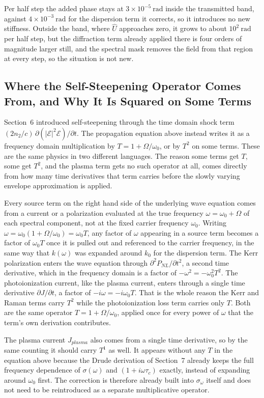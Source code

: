 Per half step the added phase stays at $3\times10^{-5}\ \text{rad}$ inside the transmitted band, against $4\times10^{-3}\ \text{rad}$ for the dispersion term it corrects, so it introduces no new stiffness. Outside the band, where $\hat{U}$ approaches zero, it grows to about $10^2\ \text{rad}$ per half step, but the diffraction term already applied there is four orders of magnitude larger still, and the spectral mask removes the field from that region at every step, so the situation is not new.

\subsection{Where the Self-Steepening Operator Comes From, and Why It Is Squared on Some Terms}

Section~6 introduced self-steepening through the time domain shock term $(2n_2/c)\,\partial(|\mathcal{E}|^2\mathcal{E})/\partial t$. The propagation equation above instead writes it as a frequency domain multiplication by $T=1+\Omega/\omega_0$, or by $T^2$ on some terms. These are the same physics in two different languages. The reason some terms get $T$, some get $T^2$, and the plasma term gets no such operator at all, comes directly from how many time derivatives that term carries before the slowly varying envelope approximation is applied.

Every source term on the right hand side of the underlying wave equation comes from a current or a polarization evaluated at the true frequency $\omega=\omega_0+\Omega$ of each spectral component, not at the fixed carrier frequency $\omega_0$. Writing $\omega=\omega_0(1+\Omega/\omega_0)=\omega_0T$, any factor of $\omega$ appearing in a source term becomes a factor of $\omega_0T$ once it is pulled out and referenced to the carrier frequency, in the same way that $k(\omega)$ was expanded around $k_0$ for the dispersion term. The Kerr polarization enters the wave equation through $\partial^2P_{NL}/\partial t^2$, a second time derivative, which in the frequency domain is a factor of $-\omega^2=-\omega_0^2T^2$. The photoionization current, like the plasma current, enters through a single time derivative $\partial J/\partial t$, a factor of $-i\omega=-i\omega_0T$. That is the whole reason the Kerr and Raman terms carry $T^2$ while the photoionization loss term carries only $T$. Both are the same operator $T=1+\Omega/\omega_0$, applied once for every power of $\omega$ that the term's own derivation contributes.

The plasma current $J_{plasma}$ also comes from a single time derivative, so by the same counting it should carry $T^1$ as well. It appears without any $T$ in the equation above because the Drude derivation of Section~7 already keeps the full frequency dependence of $\sigma(\omega)$ and $(1+i\omega\tau_c)$ exactly, instead of expanding around $\omega_0$ first. The correction is therefore already built into $\sigma_\omega$ itself and does not need to be reintroduced as a separate multiplicative operator.

